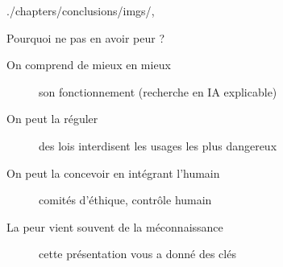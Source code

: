 \begin{graphicspathcontext}{{./chapters/conclusions/imgs/},\old}
\begin{frame}{Pourquoi ne pas en avoir peur ?}
	\begin{description}
	\item[On comprend de mieux en mieux] son fonctionnement (recherche en IA explicable)
	\vspace{.25cm}
	\item[On peut la réguler] des lois interdisent les usages les plus dangereux
	\vspace{.25cm}
	\item[On peut la concevoir en intégrant l'humain] comités d'éthique, contrôle humain
	\vspace{.25cm}
	\item[La peur vient souvent de la méconnaissance] cette présentation vous a donné des clés
	\end{description}
	\vspace{1cm}
	\larger
\end{frame}

\end{graphicspathcontext}

\endinput
